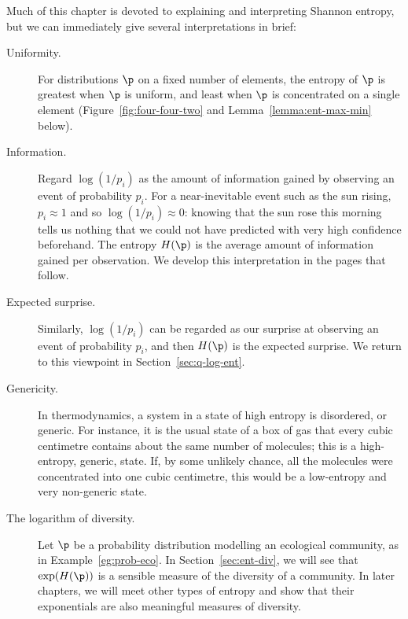Much of this chapter is devoted to explaining and interpreting Shannon
entropy, but we can immediately give several interpretations in brief:
% 
\begin{description}
\item[Uniformity.]%
% 
For distributions $\p$ on a fixed number of elements, the entropy of $\p$
is greatest when $\p$ is uniform, and least when $\p$ 
is concentrated on a single element (Figure~\ref{fig:four-four-two} and
Lemma~\ref{lemma:ent-max-min} below).

\item[Information.]
Regard $\log(1/p_i)$ as the amount of information gained by observing an
event of probability $p_i$.  For a near-inevitable event such as the sun
rising, $p_i \approx 1$ and so $\log(1/p_i) \approx 0$: knowing that the
sun rose this morning tells us nothing that we could not have predicted
with very high confidence beforehand.  The entropy $H(\p)$ is the average
amount of information gained per observation.  We develop this
interpretation in the pages that follow.

\item[Expected surprise.]
Similarly, $\log(1/p_i)$ can be regarded as our surprise at observing an
event of probability $p_i$, and then $H(\p)$ is the expected surprise.  We
return to this viewpoint in Section~\ref{sec:q-log-ent}.

\item[Genericity.]%
%
In thermodynamics, a system in a state of high entropy is disordered, or
generic.  For instance, it is the usual state of a box of gas that every
cubic centimetre contains about the same number of molecules; this is a
high-entropy, generic, state.  If, by some unlikely chance, all the
molecules were concentrated into one cubic centimetre, this would be a
low-entropy and very non-generic state.

\item[The logarithm of diversity.]
Let $\p$ be a probability distribution modelling an ecological community,
as in Example~\ref{eg:prob-eco}.  In Section~\ref{sec:ent-div}, we will see
that $\exp(H(\p))$ is a sensible measure of the diversity of a community.
In later chapters, we will meet other types of entropy and show that their
exponentials are also meaningful measures of diversity.
\end{description}

